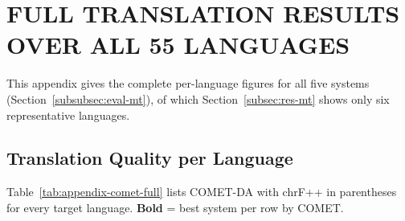 \section{FULL TRANSLATION RESULTS OVER ALL 55 LANGUAGES}
\label{app:translation-full}

This appendix gives the complete per-language figures for all five systems
(Section~\ref{subsubsec:eval-mt}), of which Section~\ref{subsec:res-mt} shows
only six representative languages.

\subsection{Translation Quality per Language}

Table~\ref{tab:appendix-comet-full} lists COMET-DA with chrF++ in parentheses
for every target language. \textbf{Bold} = best system per row by COMET.

